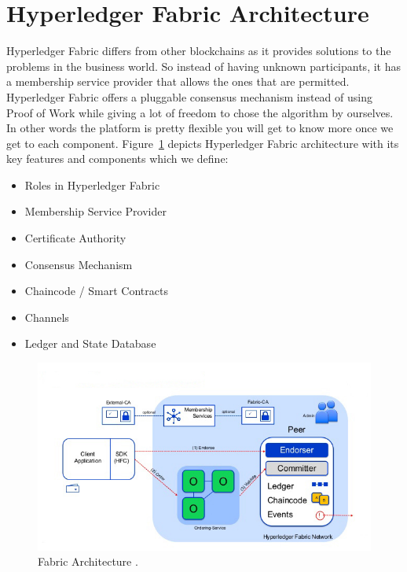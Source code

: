 \section{Hyperledger Fabric Architecture}
Hyperledger Fabric differs from other blockchains as it provides solutions to the problems in the business world. So instead of having unknown participants, it has a membership service provider that allows the ones that are permitted. Hyperledger Fabric offers a pluggable consensus mechanism instead of using Proof of Work while giving a lot of freedom to chose the algorithm by ourselves. In other words the platform is pretty flexible you will get to know more once we get to each component. Figure~\ref{fig:fabric_arch} depicts Hyperledger Fabric architecture with its key features and components which we define:
\begin{itemize}
    \item Roles in Hyperledger Fabric
     \item Membership Service Provider
     \item Certificate Authority
    \item Consensus Mechanism
    \item Chaincode / Smart Contracts 
    \item Channels
    \item Ledger and State Database
\end{itemize}
\begin{figure}[!htb]
    \centering
    \includegraphics[width=1\textwidth]{figures/HyperledgerArchitecture.jpg}
    \caption{Fabric Architecture \cite{technical-dive}.}
    \label{fig:fabric_arch}
\end{figure}

